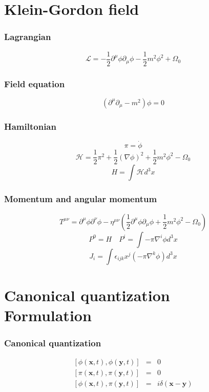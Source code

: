 \section{Klein-Gordon field}
\subsubsection{Lagrangian}
\[\mathcal{L} = -\frac{1}{2} \partial^{\mu} \phi \partial_{\mu} \phi -\frac{1}{2}m^2 \phi^2 + \Omega_0\]

\subsubsection{Field equation}
\[(\partial^{\mu} \partial_{\mu} - m^2) \phi = 0\]

\subsubsection{Hamiltonian}
\[\pi = \dot{\phi}\]
\[\mathcal{H} = \frac{1}{2} \pi^2 + \frac{1}{2} (\nabla \phi)^2 + \frac{1}{2} m^2 \phi^2-\Omega_0\]
\[H = \int \mathcal{H} d^3 x\]

\subsubsection{Momentum and angular momentum}
\[T^{\mu \nu} = \partial^{\mu} \phi \partial^{\nu} \phi - \eta^{\mu \nu}(\frac{1}{2}\partial^{\mu}\phi \partial_{\mu} \phi + \frac{1}{2}m^2 \phi^2 -\Omega_0)\]
\[P^0 = H \quad P^i = \int -\pi \nabla^i \phi d^3 x\]
\[J_i = \int  \epsilon_{ijk} x^{j} \left(- \pi \nabla^{k} \phi\right) d^3 x\]

\section{Canonical quantization Formulation}
\subsubsection{Canonical quantization}
\begin{eqnarray}
\left[\phi(\bm{x},t),\phi(\bm{y},t)\right] &=& 0 \nonumber \\
\left[\pi(\bm{x},t),\pi(\bm{y},t)\right] &=& 0 \nonumber \\
\left[\phi(\bm{x},t),\pi(\bm{y},t)\right] &=& i \delta(\bm{x}-\bm{y}) \nonumber
\end{eqnarray}

